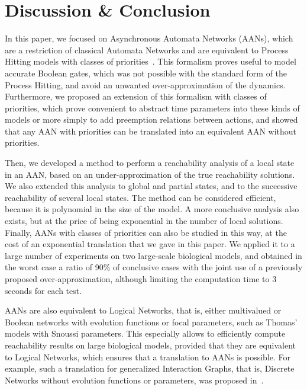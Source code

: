 \section{Discussion \& Conclusion}\label{sec:ccl}

In this paper, we focused on Asynchronous Automata Networks (AANs),
which are a restriction of classical Automata Networks
and are equivalent to Process Hitting models with classes of priorities~\cite{FPMR13-CS2Bio}.
This formalism proves useful to model accurate Boolean gates, which was not possible
with the standard form of the Process Hitting,
and avoid an unwanted over-approximation of the dynamics.
Furthermore, we proposed an extension of this formalism with classes of priorities,
which prove convenient to abstract time parameters into these kinds of models
or more simply to add preemption relations between actions,
and showed that any AAN with priorities can be translated into
an equivalent AAN without priorities.

Then, we developed a method to perform a reachability analysis
of a local state in an AAN,
based on an under-approximation of the true reachability solutions.
We also extended this analysis to global and
partial states, and to the successive reachability of several local states.
The method can be considered efficient,
because it is polynomial in the size of the model.
A more conclusive analysis also exists,
but at the price of being exponential in the number of local solutions.
Finally, AANs with classes of priorities can also be studied in this way,
at the cost of an exponential translation that we gave in this paper.
We applied it to a large number of experiments on two large-scale
biological models, and obtained in the worst case a ratio of
90\% of conclusive cases
with the joint use of a previously proposed over-approximation,
although limiting the computation time to 3 seconds for each test.

AANs are also equivalent to Logical Networks, that is,
either multivalued or Boolean networks
with evolution functions or focal parameters,
such as Thomas' models with Snoussi parameters.
This especially allows to efficiently compute reachability results
on large biological models,
provided that they are equivalent to Logical Networks,
which ensures that a translation to AANs is possible.
For example,
such a translation for generalized Interaction Graphs,
that is, Discrete Networks without evolution functions or parameters,
was proposed in~\cite{PMR10-TCSB}.

